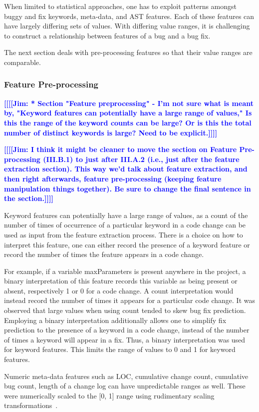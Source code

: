 \documentclass[10pt, conference, letterpaper, compsocconf]{IEEEtran}
\newcommand{\todoc}[2]{{\textcolor{#1} {\textbf{[[#2]]}}}}
\newcommand{\todoblue}[1]{\todoc{blue}{\textbf{[[#1]]}}}
\newcommand{\jim}[1]{\todoblue{Jim: #1}}
\begin{document}
When limited to statistical approaches, one has to exploit
patterns amongst buggy and fix keywords, meta-data, and AST features.
Each of these features can have largely differing sets of values. With differing
value ranges, it is challenging to construct a relationship between
features of a bug and a bug fix. 

The next section
deals with pre-processing features so that their value ranges are
comparable.

\subsubsection{Feature Pre-processing}
\jim{* Section "Feature preprocessing" - I'm not sure what is meant by, "Keyword features can potentially
have a large range of values,"  Is this the range of the keyword counts can be large? Or is this the total number of distinct keywords is large? Need to be explicit.}

\jim{I think it might be cleaner to move the section on Feature Pre-processing (III.B.1) to just after III.A.2 (i.e., just after the feature extraction section). This way we'd talk about feature extraction, and then right afterwards, feature pre-processing (keeping feature manipulation things together). Be sure to change the final sentence in the section.}

Keyword features
can potentially have a large range of values, as
a count of the number of times of occurrence of a particular keyword
in a code change can be used as input from the feature extraction process.
There is a choice on how to interpret this feature, one can either
record the presence of a keyword feature or record the number
of times the feature appears in a code change. 

For example, if a variable maxParameters is present anywhere in the
project, a binary interpretation of this feature records this
variable as being present or absent, respectively 1 or 0 for a code change. A count interpretation would instead
record the number of times it appears for a particular code change. It
was observed that large values when using count tended to skew bug fix
prediction. Employing a binary interpretation additionally allows
one to simplify fix prediction to the presence of a keyword in a code change, instead of the number of times a keyword will appear in a fix.
Thus, a binary interpretation was used for keyword features. This limits
the range of values to 0 and 1 for keyword features.

Numeric meta-data features such as LOC, cumulative change count, cumulative
bug count, length of a change log can have unpredictable ranges as
well. These were numerically scaled to the [0, 1] range using rudimentary scaling transformations~\cite{saunders1998support}. 
\end{document}
